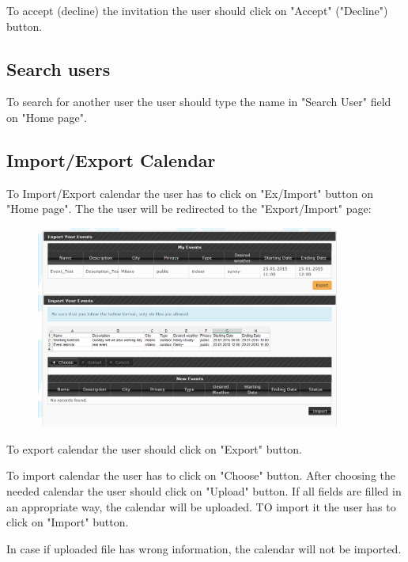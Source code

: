 \par To accept (decline) the invitation the user should click on "Accept" ("Decline") button.

\subsection{Search users}
\par \qquad To search for another user the user should type the name in "Search User" field on "Home page".

\newpage
\subsection{Import/Export Calendar}
\par \qquad To Import/Export calendar the user has to click on "Ex/Import" button on "Home page". The the user will be redirected to the "Export/Import" page:
   \begin{figure}[tbh]
  \begin{center}
    \includegraphics[width=100mm]{eximpo}
  \end{center}
\end{figure}

\par To export calendar the user should click on "Export" button.
\par To import calendar the user has to click on "Choose" button. After choosing the needed calendar the user should click on "Upload" button. If all fields are filled in an appropriate way, the calendar will be uploaded. TO import it the user has to click on "Import" button. 
\par In case if uploaded file has wrong information, the calendar will not be imported.




